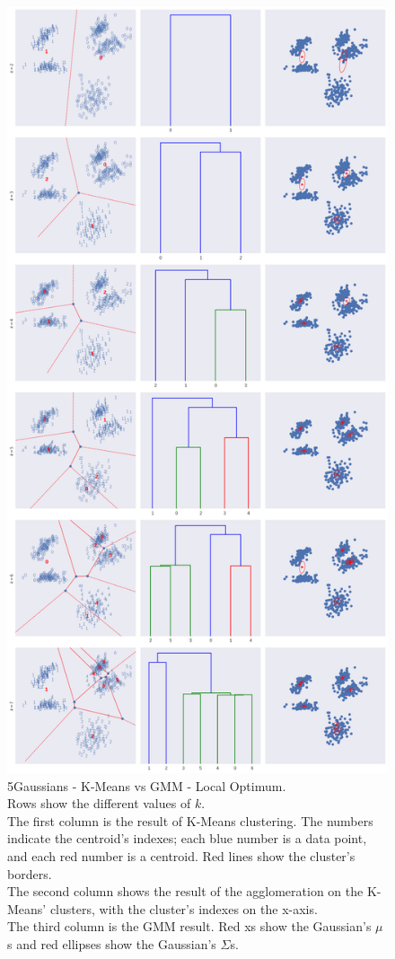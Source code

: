 \documentclass[a4paper,11pt]{article}
\begin{document}
\begin{figure}
    \centering
   	\includegraphics[scale=0.23]{../images/assignment7_local_optima.png}
    \caption{\small{5Gaussians - K-Means vs GMM - Local Optimum.
        \\ Rows show the different values of $k$.
        \\The first column is the result of K-Means clustering. The numbers indicate the centroid's indexes; each blue number is a data point, and each red number is a centroid. Red lines show the cluster's borders.
         \\The second column shows the result of the agglomeration on the K-Means' clusters, with the cluster's indexes on the x-axis.
         \\The third column is the GMM result. Red xs show the Gaussian's $\mu$s and red ellipses show the Gaussian's $\Sigma$s.}}
    \label{fig:assignment7_1}
\end{figure}
\end{document}
